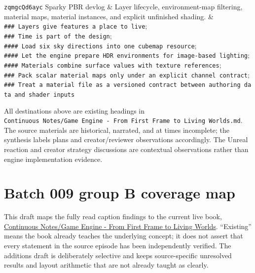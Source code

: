 {\begin{longtable}[]
\texttt{zqmgcQd6ayc} Sparky PBR devlog & Layer lifecycle, environment-map filtering, material maps, material instances, and explicit unfinished shading. & \texttt{\#\#\#\ Layers\ give\ features\ a\ place\ to\ live}; \texttt{\#\#\#\ Time\ is\ part\ of\ the\ design}; \texttt{\#\#\#\#\ Load\ six\ sky\ directions\ into\ one\ cubemap\ resource}; \texttt{\#\#\#\#\ Let\ the\ engine\ prepare\ HDR\ environments\ for\ image-based\ lighting}; \texttt{\#\#\#\#\ Materials\ combine\ surface\ values\ with\ texture\ references}; \texttt{\#\#\#\ Pack\ scalar\ material\ maps\ only\ under\ an\ explicit\ channel\ contract}; \texttt{\#\#\#\ Treat\ a\ material\ file\ as\ a\ versioned\ contract\ between\ authoring\ data\ and\ shader\ inputs} \\
\end{longtable}
}

All destinations above are existing headings in \texttt{Continuous\ Notes/Game\ Engine\ -\ From\ First\ Frame\ to\ Living\ Worlds.md}. The source materials are historical, narrated, and at times incomplete; the synthesis labels plans and creator/reviewer observations accordingly. The Unreal reaction and creator strategy discussions are contextual observations rather than engine implementation evidence.

\section{Batch 009 group B coverage map}\label{batch-009-group-b-coverage-map}

This draft maps the fully read caption findings to the current live book, \href{Continuous\%20Notes/Game\%20Engine\%20-\%20From\%20First\%20Frame\%20to\%20Living\%20Worlds}{Continuous Notes/Game Engine - From First Frame to Living Worlds}. ``Existing'' means the book already teaches the underlying concept; it does not assert that every statement in the source episode has been independently verified. The additions draft is deliberately selective and keeps source-specific unresolved results and layout arithmetic that are not already taught as clearly.

